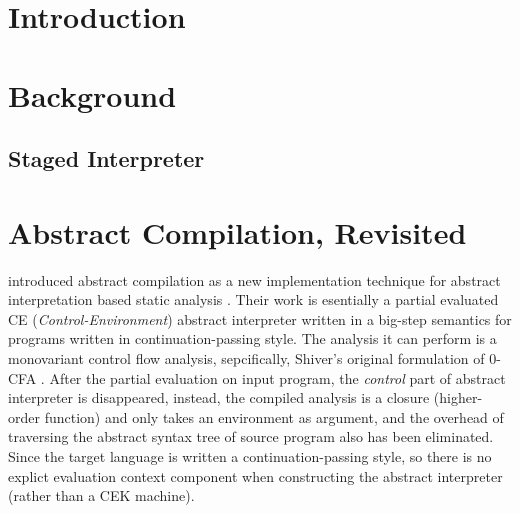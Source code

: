 \documentclass[sigplan,anonymous,review]{acmart}
\begin{document}




\maketitle

\section{Introduction}

\section{Background}

\subsection{Staged Interpreter}

\section{Abstract Compilation, Revisited}

\citeauthor{Boucher:1996:ACN:647473.727587} introduced abstract compilation as a new
implementation technique for abstract interpretation based static analysis \cite{Boucher:1996:ACN:647473.727587}.
Their work is esentially a partial evaluated CE (\textit{Control-Environment}) abstract
interpreter written in a big-step semantics for programs written in continuation-passing style.
The analysis it can perform is a monovariant control flow analysis, sepcifically, Shiver's original
formulation of 0-CFA \cite{Shivers:1991:SSC:115865.115884, Shivers:1988:CFA:53990.54007}.
After the partial evaluation on input program, the \textit{control} part of abstract interpreter
is disappeared, instead, the compiled analysis is a closure (higher-order function) and
only takes an environment as argument,
and the overhead of traversing the abstract syntax tree of source program also has been eliminated.
Since the target language is written a continuation-passing style, so there is
no explict evaluation context component when constructing the abstract interpreter
(rather than a CEK machine).
\end{document}
